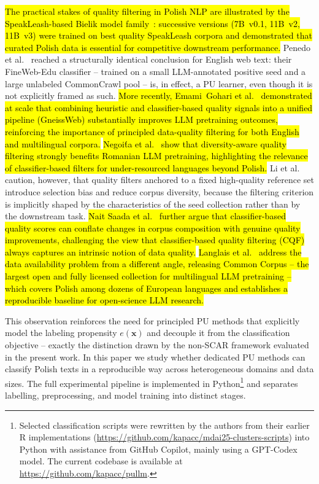 \documentclass[applsci,article,submit,pdftex,moreauthors]{Definitions/mdpi}
\newcommand{\rev}[1]{\hl{#1}}
\begin{document}
\rev{The practical stakes of quality filtering in Polish NLP are illustrated by the SpeakLeash-based Bielik model family~\cite{bielik7b,bielik11bv3,ociepa2026bielikv3tok}: successive versions (7B~v0.1, 11B~v2, 11B~v3) were trained on best quality SpeakLeash corpora and demonstrated that curated Polish data is essential for competitive downstream performance.} Penedo et al.~\cite{penedo2024fineweb} reached a structurally identical conclusion for English web text: their FineWeb-Edu classifier -- trained on a small LLM-annotated positive seed and a large unlabeled CommonCrawl pool -- is, in effect, a PU learner, even though it is not explicitly framed as such. \rev{More recently, Emami~Gohari et al.~\cite{emami2026gneissweb} demonstrated at scale that combining heuristic and classifier-based quality signals into a unified pipeline (GneissWeb) substantially improves LLM pretraining outcomes, reinforcing the importance of principled data-quality filtering for both English and multilingual corpora.} \rev{Negoi\'{t}a et al.~\cite{negoita2026romanianllm} show that diversity-aware quality filtering strongly benefits Romanian LLM pretraining, highlighting the relevance of classifier-based filters for under-resourced languages beyond Polish.} Li et al.~\cite{li2024scalingfilter} caution, however, that quality filters anchored to a fixed high-quality reference set introduce selection bias and reduce corpus diversity, because the filtering criterion is implicitly shaped by the characteristics of the seed collection rather than by the downstream task. \rev{Nait Saada et al.~\cite{saada2026cqf} further argue that classifier-based quality scores can conflate changes in corpus composition with genuine quality improvements, challenging the view that classifier-based quality filtering (CQF) always captures an intrinsic notion of data quality.} \rev{Langlais et al.~\cite{langlais2026commoncorpus} address the data availability problem from a different angle, releasing Common Corpus -- the largest open and fully licensed collection for multilingual LLM pretraining -- which covers Polish among dozens of European languages and establishes a reproducible baseline for open-science LLM research.}

This observation reinforces the need for principled PU methods that explicitly model the labeling propensity $e(\mathbf{x})$ and decouple it from the classification objective -- exactly the distinction drawn by the non-SCAR framework evaluated in the present work. In this paper we study whether dedicated PU methods can classify Polish texts in a reproducible way across heterogeneous domains and data sizes. The full experimental pipeline is implemented in Python\footnote{Selected classification scripts were rewritten by the authors from their earlier R implementations (\url{https://github.com/kapacc/mdai25-clusters-scripts}) into Python with assistance from GitHub Copilot, mainly using a GPT-Codex model. The current codebase is available at \url{https://github.com/kapacc/pullm}.} and separates labelling, preprocessing, and model training into distinct stages.
\end{document}
